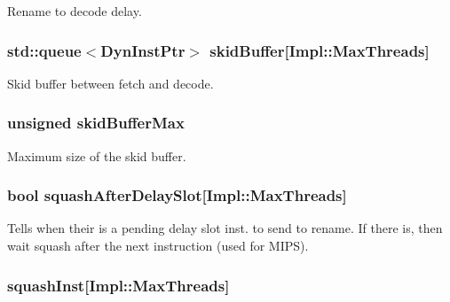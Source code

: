 \label{classDefaultDecode_a3b9933c4d891d5618e6a103f0c231e8c}
Rename to decode delay. \hypertarget{classDefaultDecode_a911bfd7c5c1efbd9f479d2b960078ec1}{
\subsubsection[{skidBuffer}]{\setlength{\rightskip}{0pt plus 5cm}std::queue$<${\bf DynInstPtr}$>$ {\bf skidBuffer}\mbox{[}Impl::MaxThreads\mbox{]}}}
\label{classDefaultDecode_a911bfd7c5c1efbd9f479d2b960078ec1}
Skid buffer between fetch and decode. \hypertarget{classDefaultDecode_a268414a6444b620140f263013a739a17}{
\subsubsection[{skidBufferMax}]{\setlength{\rightskip}{0pt plus 5cm}unsigned {\bf skidBufferMax}}}
\label{classDefaultDecode_a268414a6444b620140f263013a739a17}
Maximum size of the skid buffer. \hypertarget{classDefaultDecode_ab0db2d75f6bf41c785017f8c3af9c16b}{
\subsubsection[{squashAfterDelaySlot}]{\setlength{\rightskip}{0pt plus 5cm}bool {\bf squashAfterDelaySlot}\mbox{[}Impl::MaxThreads\mbox{]}}}
\label{classDefaultDecode_ab0db2d75f6bf41c785017f8c3af9c16b}
Tells when their is a pending delay slot inst. to send to rename. If there is, then wait squash after the next instruction (used for MIPS). \hypertarget{classDefaultDecode_ab16bbdee47d26fedf584262248b6b6e4}{
\subsubsection[{squashInst}]{ {\bf squashInst}\mbox{[}Impl::MaxThreads\mbox{]}}}
